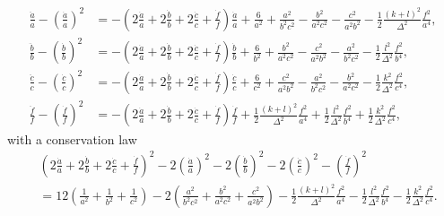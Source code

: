 \documentclass[11pt,letterpaper]{amsart}
\theoremstyle{definition}
\numberwithin{equation}{section}
\begin{document}
\begin{equation}
\label{eqn: original Einstein equation}
\begin{split}
\frac{\ddot{a}}{a}-\left(\frac{\dot{a}}{a}\right)^2&=-\left(2\frac{\dot{a}}{a}+2\frac{\dot{b}}{b}+2\frac{\dot{c}}{c}+\frac{\dot{f}}{f}\right)\frac{\dot{a}}{a}+\frac{6}{a^2}+\frac{a^2}{b^2c^2}-\frac{b^2}{a^2c^2}-\frac{c^2}{a^2b^2}-\frac{1}{2}\frac{(k+l)^2}{\Delta^2}\frac{f^2}{a^4},\\
\frac{\ddot{b}}{b}-\left(\frac{\dot{b}}{b}\right)^2&=-\left(2\frac{\dot{a}}{a}+2\frac{\dot{b}}{b}+2\frac{\dot{c}}{c}+\frac{\dot{f}}{f}\right)\frac{\dot{b}}{b}+\frac{6}{b^2}+\frac{b^2}{a^2c^2}-\frac{c^2}{a^2b^2}-\frac{a^2}{b^2c^2}-\frac{1}{2}\frac{l^2}{\Delta^2}\frac{f^2}{b^4},\\
\frac{\ddot{c}}{c}-\left(\frac{\dot{c}}{c}\right)^2&=-\left(2\frac{\dot{a}}{a}+2\frac{\dot{b}}{b}+2\frac{\dot{c}}{c}+\frac{\dot{f}}{f}\right)\frac{\dot{c}}{c}+\frac{6}{c^2}+\frac{c^2}{a^2b^2}-\frac{a^2}{b^2c^2}-\frac{b^2}{a^2c^2}-\frac{1}{2}\frac{k^2}{\Delta^2}\frac{f^2}{c^4},\\
\frac{\ddot{f}}{f}-\left(\frac{\dot{f}}{f}\right)^2&=-\left(2\frac{\dot{a}}{a}+2\frac{\dot{b}}{b}+2\frac{\dot{c}}{c}+\frac{\dot{f}}{f}\right)\frac{\dot{f}}{f}+\frac{1}{2}\frac{(k+l)^2}{\Delta^2}\frac{f^2}{a^4}+\frac{1}{2}\frac{l^2}{\Delta^2}\frac{f^2}{b^4}+\frac{1}{2}\frac{k^2}{\Delta^2}\frac{f^2}{c^4},
\end{split}
\end{equation}
with a conservation law
\begin{equation}
\label{eqn: original conservation}
\begin{split}
&\left(2\frac{\dot{a}}{a}+2\frac{\dot{b}}{b}+2\frac{\dot{c}}{c}+\frac{\dot{f}}{f}\right)^2-2\left(\frac{\dot{a}}{a}\right)^2-2\left(\frac{\dot{b}}{b}\right)^2-2\left(\frac{\dot{c}}{c}\right)^2-\left(\frac{\dot{f}}{f}\right)^2\\
&=12\left(\frac{1}{a^2}+\frac{1}{b^2}+\frac{1}{c^2}\right)-2\left(\frac{a^2}{b^2c^2}+\frac{b^2}{a^2c^2}+\frac{c^2}{a^2b^2}\right)-\frac{1}{2}\frac{(k+l)^2}{\Delta^2}\frac{f^2}{a^4}-\frac{1}{2}\frac{l^2}{\Delta^2}\frac{f^2}{b^4}-\frac{1}{2}\frac{k^2}{\Delta^2}\frac{f^2}{c^4}.
\end{split}
\end{equation}
\end{document}

